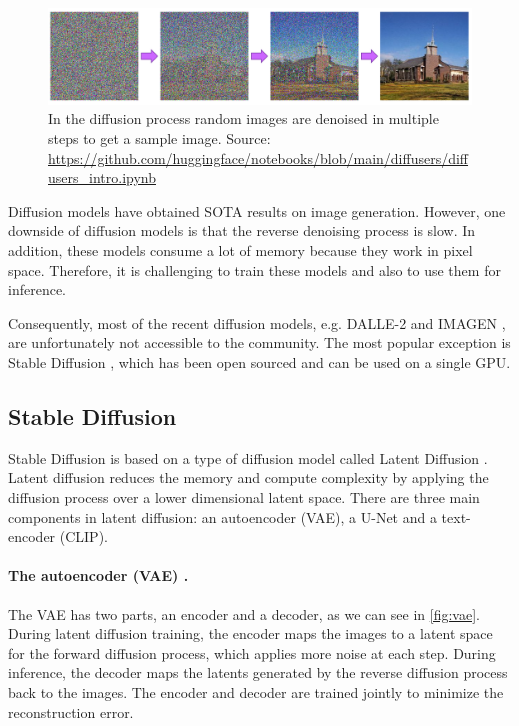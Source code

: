 \begin{figure}[ht]
    \centering
    \includegraphics[width=\linewidth]{images/diffusion-process.png}
    \caption{In the diffusion process random images are denoised in multiple steps to get a sample image. Source: \url{https://github.com/huggingface/notebooks/blob/main/diffusers/diffusers_intro.ipynb}}
    \label{fig:diffusion_process}
\end{figure}

Diffusion models have obtained SOTA results on image generation. However, one downside of diffusion models is that the reverse denoising process is slow. In addition, these models consume a lot of memory because they work in pixel space. Therefore, it is challenging to train these models and also to use them for inference.

Consequently, most of the recent diffusion models, e.g. DALLE-2 \cite{ramesh2022hierarchical} and IMAGEN \cite{saharia2022photorealistic}, are unfortunately not accessible to the community. The most popular exception is Stable Diffusion \cite{rombach2021highresolution}, which has been open sourced and can be used on a single GPU.

\subsection{Stable Diffusion}

Stable Diffusion is based on a type of diffusion model called Latent Diffusion \cite{rombach2021highresolution}. Latent diffusion reduces the memory and compute complexity by applying the diffusion process over a lower dimensional latent space. There are three main components in latent diffusion: an autoencoder (VAE), a U-Net and a text-encoder (CLIP).

\paragraph{The autoencoder (VAE) \cite{kingma2013auto}.} The VAE has two parts, an encoder and a decoder, as we can see in \cref{fig:vae}. During latent diffusion training, the encoder maps the images to a latent space for the forward diffusion process, which applies more noise at each step. During inference, the decoder maps the latents generated by the reverse diffusion process back to the images. The encoder and decoder are trained jointly to minimize the reconstruction error.

